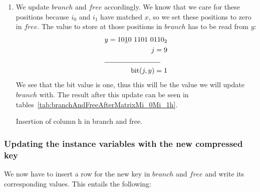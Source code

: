 \begin{enumerate}
    \item
    We update $branch$ and $free$ accordingly. We know that we care for these positions because $i_0$ and $i_1$ have matched $x$, so we set these positions to zero in $free$. The value to store at those positions in $branch$ has to be read from $y$:
    \begin{align*}
        y = 10\underline{1}0\ 1101\ 0110_2 \\
        j = 9 \\
        \cline{1-2}
        \text{bit}(j, y) = 1
    \end{align*}
    We see that the bit value is one, thus this will be the value we will update $branch$ with. The result after this update can be seen in tables~\ref{tab:branchAndFreeAfterMatrixMi_0Mi_1h}.
    \begin{table}[H]
    \centering
    
    \caption{Insertion of column h in branch and free.}
    \label{tab:branchAndFreeAfterMatrixMi_0Mi_1h}
    \end{table}
\end{enumerate}

\subsubsection{Updating the instance variables with the new compressed key} \label{sec:updateRankRow}

We now have to insert a row for the new key in $branch$ and $free$ and write its corresponding values. This entails the following:

